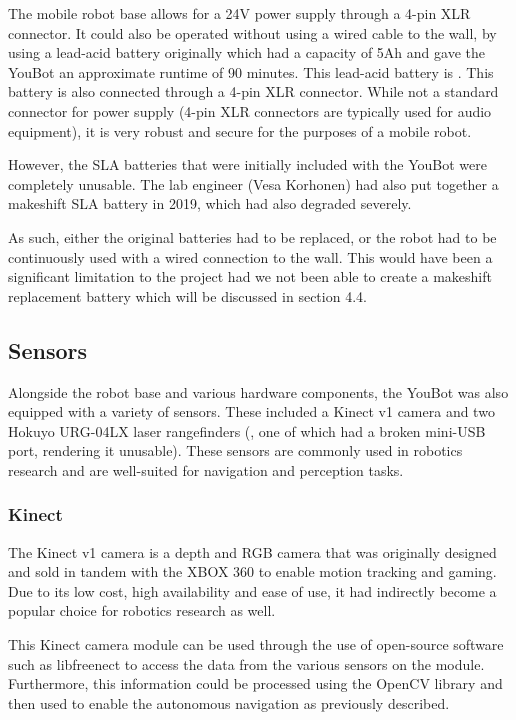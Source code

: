 \documentclass[a4paper, 12pt]{article}
\newif\ifshownotes
\newcommand{\notes}[1]{\ifshownotes\textcolor{blue}{#1}\fi}
\begin{document}
    The mobile robot base allows for a 24V power supply through a 4-pin XLR connector. It could also be operated without using a wired cable to the wall, by using a lead-acid battery originally which had a capacity of 5Ah and gave the YouBot an approximate runtime of 90 minutes. This lead-acid battery is \notes{[dimensions here]}. This battery is also connected through a 4-pin XLR connector. While not a standard connector for power supply (4-pin XLR connectors are typically used for audio equipment), it is very robust and secure for the purposes of a mobile robot. 

    However, the SLA batteries that were initially included with the YouBot were completely unusable. The lab engineer (Vesa Korhonen) had also put together a makeshift SLA battery in 2019, which had also degraded severely. 

    As such, either the original batteries had to be replaced, or the robot had to be continuously used with a wired connection to the wall. This would have been a significant limitation to the project had we not been able to create a makeshift replacement battery which will be discussed in section 4.4.
    

    \subsection{Sensors}
    
    Alongside the robot base and various hardware components, the YouBot was also equipped with a variety of sensors. These included a Kinect v1 camera and two Hokuyo URG-04LX laser rangefinders (, one of which had a broken mini-USB port, rendering it unusable). These sensors are commonly used in robotics research and are well-suited for navigation and perception tasks.

    \subsubsection{Kinect}  

    The Kinect v1 camera is a depth and RGB camera that was originally designed and sold in tandem with the XBOX 360 to enable motion tracking and gaming. Due to its low cost, high availability and ease of use, it had indirectly become a popular choice for robotics research as well.

    This Kinect camera module can be used through the use of open-source software such as libfreenect \notes{[cite]} to access the data from the various sensors on the module. Furthermore, this information could be processed using the OpenCV library and then used to enable the autonomous navigation as previously described. 
\end{document}
